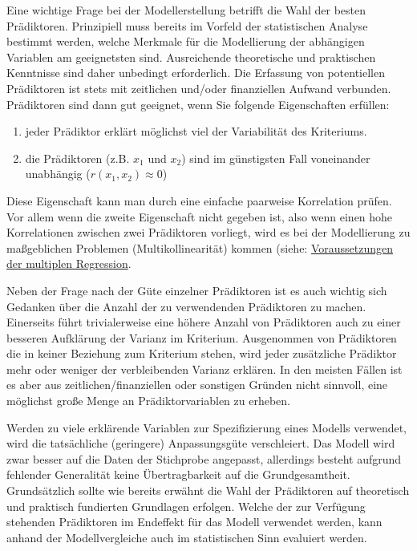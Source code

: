 \documentclass[]{article}
\providecommand{\tightlist}{%
  \setlength{\itemsep}{0pt}\setlength{\parskip}{0pt}}
\begin{document}
Eine wichtige Frage bei der Modellerstellung betrifft die Wahl der
besten Prädiktoren. Prinzipiell muss bereits im Vorfeld der
statistischen Analyse bestimmt werden, welche Merkmale für die
Modellierung der abhängigen Variablen am geeignetsten sind. Ausreichende
theoretische und praktischen Kenntnisse sind daher unbedingt
erforderlich. Die Erfassung von potentiellen Prädiktoren ist stets mit
zeitlichen und/oder finanziellen Aufwand verbunden. Prädiktoren sind
dann gut geeignet, wenn Sie folgende Eigenschaften erfüllen:

\begin{enumerate}
\def\labelenumi{\arabic{enumi}.}
\tightlist
\item
  jeder Prädiktor erklärt möglichst viel der Variabilität des
  Kriteriums.
\item
  die Prädiktoren (z.B. \(x_1\) und \(x_2\)) sind im günstigsten Fall
  voneinander unabhängig (\(r(x_1,x_2) \approx 0\))
\end{enumerate}

Diese Eigenschaft kann man durch eine einfache paarweise Korrelation
prüfen. Vor allem wenn die zweite Eigenschaft nicht gegeben ist, also
wenn einen hohe Korrelationen zwischen zwei Prädiktoren vorliegt, wird
es bei der Modellierung zu maßgeblichen Problemen (Multikollinearität)
kommen (siehe:
\protect\hyperlink{voraussetzungen-der-multiplen-regression}{Voraussetzungen
der multiplen Regression}.

Neben der Frage nach der Güte einzelner Prädiktoren ist es auch wichtig
sich Gedanken über die Anzahl der zu verwendenden Prädiktoren zu machen.
Einerseits führt trivialerweise eine höhere Anzahl von Prädiktoren auch
zu einer besseren Aufklärung der Varianz im Kriterium. Ausgenommen von
Prädiktoren die in keiner Beziehung zum Kriterium stehen, wird jeder
zusätzliche Prädiktor mehr oder weniger der verbleibenden Varianz
erklären. In den meisten Fällen ist es aber aus zeitlichen/finanziellen
oder sonstigen Gründen nicht sinnvoll, eine möglichst große Menge an
Prädiktorvariablen zu erheben.

Werden zu viele erklärende Variablen zur Spezifizierung eines Modells
verwendet, wird die tatsächliche (geringere) Anpassungsgüte
verschleiert. Das Modell wird zwar besser auf die Daten der Stichprobe
angepasst, allerdings besteht aufgrund fehlender Generalität keine
Übertragbarkeit auf die Grundgesamtheit. Grundsätzlich sollte wie
bereits erwähnt die Wahl der Prädiktoren auf theoretisch und praktisch
fundierten Grundlagen erfolgen. Welche der zur Verfügung stehenden
Prädiktoren im Endeffekt für das Modell verwendet werden, kann anhand
der Modellvergleiche auch im statistischen Sinn evaluiert werden.
\end{document}
